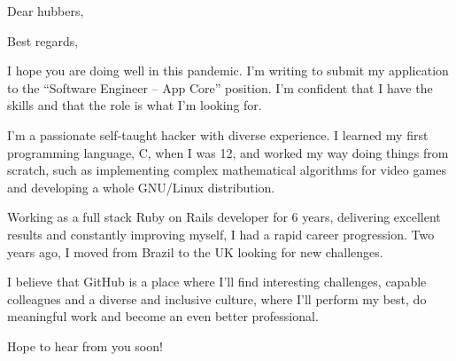 \documentclass[a4paper,10pt]{moderncv}
\begin{document}
\clearpage


\date{April 26, 2021}
\opening{Dear hubbers,}
\closing{Best regards,}
\makelettertitle

I hope you are doing well in this pandemic. I’m writing to submit my application to the “Software Engineer – App Core” position. I’m confident that I have the skills and that the role is what I’m looking for.

I'm a passionate self-taught hacker with diverse experience. I learned my first programming language, C, when I was 12, and worked my way doing things from scratch, such as implementing complex mathematical algorithms for video games and developing a whole GNU/Linux distribution.

Working as a full stack Ruby on Rails developer for 6 years, delivering excellent results and constantly improving myself, I had a rapid career progression. Two years ago, I moved from Brazil to the UK looking for new challenges.

I believe that GitHub is a place where I’ll find interesting challenges, capable colleagues and a diverse and inclusive culture, where I’ll perform my best, do meaningful work and become an even better professional.

Hope to hear from you soon!

\makeletterclosing
\end{document}
